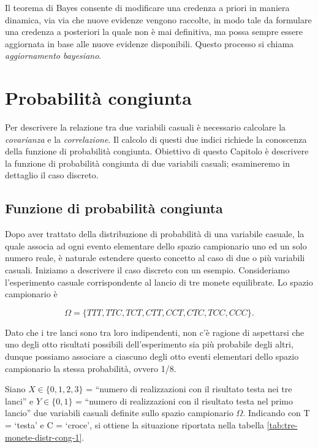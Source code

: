 \documentclass[
  11pt,
]{krantz}
\theoremstyle{definition}
\theoremstyle{definition}
\theoremstyle{definition}
\theoremstyle{definition}
\theoremstyle{remark}
\begin{document}
Il teorema di Bayes consente di modificare una credenza a priori in maniera dinamica, via via che nuove evidenze vengono raccolte, in modo tale da formulare una credenza a posteriori la quale non è mai definitiva, ma possa sempre essere aggiornata in base alle nuove evidenze disponibili. Questo processo si chiama \emph{aggiornamento bayesiano}.

\hypertarget{chapter-prob-congiunta}{%
\chapter{Probabilità congiunta}\label{chapter-prob-congiunta}}

Per descrivere la relazione tra due variabili casuali è necessario calcolare la \emph{covarianza} e la \emph{correlazione}. Il calcolo di questi due indici richiede la conoscenza della funzione di probabilità congiunta. Obiettivo di questo Capitolo è descrivere la funzione di probabilità congiunta di due variabili casuali; esamineremo in dettaglio il caso discreto.

\hypertarget{funzione-di-probabilituxe0-congiunta}{%
\section{Funzione di probabilità congiunta}\label{funzione-di-probabilituxe0-congiunta}}

Dopo aver trattato della distribuzione di probabilità di una variabile casuale, la quale associa ad ogni evento elementare dello spazio campionario uno ed un solo numero reale, è naturale estendere questo concetto al caso di due o più variabili casuali. Iniziamo a descrivere il caso discreto con un esempio. Consideriamo l'esperimento casuale corrispondente al lancio di tre monete equilibrate. Lo spazio campionario è

\[
\Omega = \{TTT, TTC, TCT, CTT, CCT, CTC, TCC, CCC\}.
\]

Dato che i tre lanci sono tra loro indipendenti, non c'è ragione di aspettarsi che uno degli otto risultati possibili dell'esperimento sia più probabile degli altri, dunque possiamo associare a ciascuno degli otto eventi elementari dello spazio campionario la stessa probabilità, ovvero 1/8.

Siano \(X \in \{0, 1, 2, 3\}\) = ``numero di realizzazioni con il risultato testa nei tre lanci'' e \(Y \in \{0, 1\}\) = ``numero di realizzazioni con il risultato testa nel primo lancio'' due variabili casuali definite sullo spazio campionario \(\Omega\). Indicando con T = `testa' e C = `croce', si ottiene la situazione riportata nella tabella \ref{tab:tre-monete-distr-cong-1}.
\end{document}
